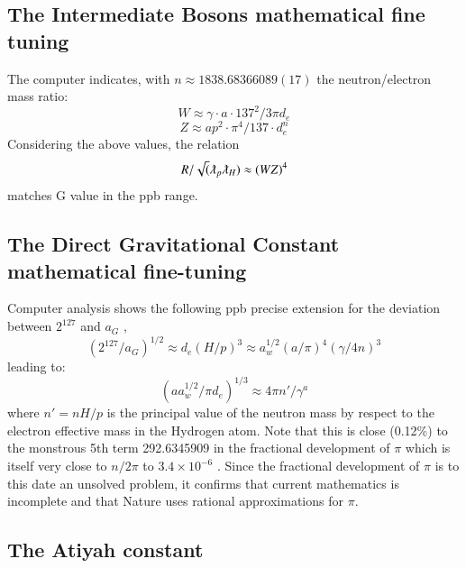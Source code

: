 \documentclass[twoside,draft]{article}
\begin{document}
\begin{sloppypar}
{\subsection {The Intermediate Bosons mathematical fine tuning}

The computer indicates, with $n \approx 1838.68366089(17)$ the neutron/electron mass ratio:
\begin{equation}
W \approx \gamma \cdot a \cdot 137^{2} / 3\pi d_{e}
\end{equation}
\begin{equation}
Z \approx ap^{2} \cdot \pi^{4} / 137 \cdot d_{e}^{n}
\end{equation}
Considering the above values, the relation $$R/\sqrt(\lambdabar_{p} \lambdabar_{H} ) \approx (WZ)^{4}$$ matches G value in the ppb range.

\subsection {The Direct Gravitational Constant mathematical fine-tuning}

Computer analysis shows the following ppb precise extension for the deviation between $2^{127}$ and
$a_{G}$ ,
\begin{equation}
(2^{127} / a_{G})^{1/2} \approx d_{e} (H/p)^{3} \approx a_{w}^{1/2} (a/\pi)^{4} ( \gamma/4n)^{3}
\end{equation}
leading to:
\begin{equation}
(aa_{w}^{1/2} /\pi d_{e})^{1/3} \approx 4\pi n\prime/ \gamma^{a}
\end{equation}
where $n\prime = nH/p$ is the principal value of the neutron mass by respect to the electron effective mass
in the Hydrogen atom. Note that this is close (0.12\%) to the monstrous 5th term 292.6345909 in
the fractional development of $\pi$ which is itself very close to $n/2\pi$ to $3.4 \times 10^{-6}$ . Since the fractional
development of $\pi$ is to this date an unsolved problem, it confirms that current mathematics is
incomplete and that Nature uses rational approximations for $\pi$.

\subsection {The Atiyah constant}

}
\end{sloppypar}
\end{document}
